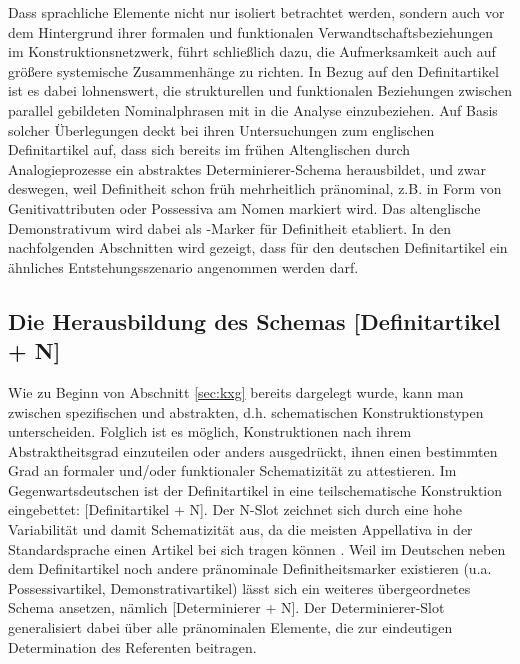 Dass sprachliche Elemente nicht nur isoliert betrachtet werden, sondern auch vor dem Hintergrund ihrer formalen und funktionalen Verwandtschaftsbeziehungen im Konstruktionsnetzwerk, führt schließlich dazu, die Aufmerksamkeit auch auf größere systemische Zusammenhänge zu richten. In Bezug auf den Definitartikel ist es dabei lohnenswert, die strukturellen und funktionalen Beziehungen zwischen parallel gebildeten Nominalphrasen mit in die Analyse einzubeziehen. Auf Basis solcher Überlegungen deckt \textcite{Sommerer2011,Sommerer2012,Sommerer2015} bei ihren Untersuchungen zum englischen Definitartikel auf, dass sich bereits im frühen Altenglischen durch Analogieprozesse ein abstraktes Determinierer-Schema herausbildet, und zwar deswegen, weil Definitheit schon früh mehrheitlich pränominal, z.B. in Form von Genitivattributen oder Possessiva am Nomen markiert wird. Das altenglische Demonstrativum  wird dabei als -Marker für Definitheit etabliert. In den nachfolgenden Abschnitten wird gezeigt, dass für den deutschen Definitartikel ein ähnliches Entstehungsszenario angenommen werden darf. 

\subsection{Die Herausbildung des Schemas [Definitartikel + N]}\label{sec:schema}

Wie zu Beginn von Abschnitt \ref{sec:kxg} bereits dargelegt wurde, kann man zwischen spezifischen  und abstrakten, d.h. schematischen Konstruktionstypen unterscheiden.
Folglich ist es möglich, Konstruktionen nach ihrem Abstraktheitsgrad einzuteilen oder anders ausgedrückt, ihnen einen bestimmten Grad an formaler und/oder funktionaler Schematizität zu attestieren. Im Gegenwartsdeutschen ist der Definitartikel in eine teilschematische Konstruktion eingebettet: [Definitartikel + N]. Der N-Slot zeichnet sich durch eine hohe Variabilität und damit Schematizität aus, da die meisten Appellativa in der Standardsprache einen Artikel bei sich tragen können \parencite[zu den Ausnahmen s.][]{DAvis2013}.
Weil im Deutschen neben dem Definitartikel noch andere pränominale Definitheitsmarker existieren (u.a. Possessivartikel, Demonstrativartikel) lässt sich ein weiteres übergeordnetes Schema ansetzen, nämlich [Determinierer + N]. Der Determinierer-Slot generalisiert dabei über alle pränominalen Elemente, die zur eindeutigen Determination des Referenten beitragen. 


